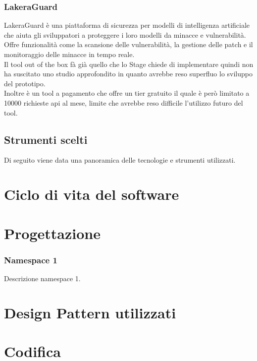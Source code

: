 \subsubsection*{LakeraGuard}
LakeraGuard è una piattaforma di sicurezza per modelli di intelligenza artificiale che aiuta gli sviluppatori a proteggere i loro modelli da minacce e vulnerabilità. Offre funzionalità come la scansione delle vulnerabilità, la gestione delle patch e il monitoraggio delle minacce in tempo reale.\\
Il tool out of the box fà già quello che lo Stage chiede di implementare quindi non ha suscitato uno studio approfondito in quanto avrebbe reso superfluo lo sviluppo del prototipo.\\
Inoltre è un tool a pagamento che offre un tier gratuito il quale è però limitato a 10000 richieste \gls{api} al mese, limite che avrebbe reso difficile l'utilizzo futuro del tool.


\subsection{Strumenti scelti}
Di seguito viene data una panoramica delle tecnologie e strumenti utilizzati.


\section{Ciclo di vita del software}
\label{sec:ciclo-vita-software}

\section{Progettazione}
\label{sec:progettazione}

\subsubsection{Namespace 1} %
Descrizione namespace 1.

\begin{namespacedesc}
\end{namespacedesc}


\section{Design Pattern utilizzati}

\section{Codifica}
